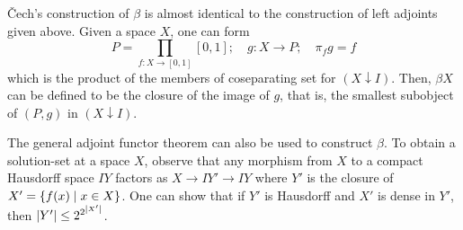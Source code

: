 \begin{remark}
    \v{C}ech's construction of \( \beta \) is almost identical to the construction of left adjoints given above.
    Given a space \( X \), one can form
    \[ P = \prod_{f : X \to [0,1]} [0,1];\quad g : X \to P;\quad \pi_f g = f \]
    which is the product of the members of coseparating set for \( (X \downarrow I) \).
    Then, \( \beta X \) can be defined to be the closure of the image of \( g \), that is, the smallest subobject of \( (P, g) \) in \( (X \downarrow I) \).

    The general adjoint functor theorem can also be used to construct \( \beta \).
    To obtain a solution-set at a space \( X \), observe that any morphism from \( X \) to a compact Hausdorff space \( IY \) factors as \( X \to IY' \to IY \) where \( Y' \) is the closure of \( X' = \qty{f(x) \mid x \in X} \).
    One can show that if \( Y' \) is Hausdorff and \( X' \) is dense in \( Y' \), then \( \abs{Y'} \leq 2^{2^{\abs{X'}}} \).
\end{remark}
